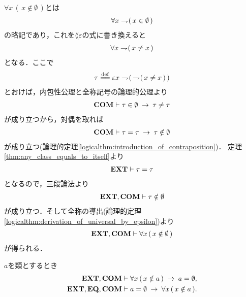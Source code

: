 	\begin{sketch}
		$\forall x\, (\, x \notin \emptyset\, )$とは
		\begin{align}
			\forall x \rightharpoondown\hspace{-0.25em} (\, x \in \emptyset\, )
		\end{align}
		の略記であり，これを$\lang{\varepsilon}$の式に書き換えると
		\begin{align}
			\forall x \rightharpoondown\hspace{-0.25em} (\, x \neq x\, )
		\end{align}
		となる．ここで
		\begin{align}
			\tau \defeq \varepsilon x \negation (\, \negation (\, x \neq x\, )\, )
		\end{align}
		とおけば，内包性公理と全称記号の論理的公理より
		\begin{align}
			\mbox{\bf COM} \vdash \tau \in \emptyset \hspace{0.25em}\rightarrow\hspace{0.25em} \tau \neq \tau
		\end{align}
		が成り立つから，対偶を取れば
		\begin{align}
			\mbox{\bf COM} \vdash \tau = \tau \hspace{0.25em}\rightarrow\hspace{0.25em} \tau \notin \emptyset
		\end{align}
		が成り立つ(論理的定理\ref{logicalthm:introduction_of_contraposition})．
		定理\ref{thm:any_class_equals_to_itself}より
		\begin{align}
			\mbox{{\bf EXT}} \vdash \tau = \tau
		\end{align}
		となるので，三段論法より
		\begin{align}
			\mbox{{\bf EXT}},\mbox{\bf COM} \vdash \tau \notin \emptyset
		\end{align}
		が成り立つ．そして全称の導出(論理的定理\ref{logicalthm:derivation_of_universal_by_epsilon})より
		\begin{align}
			\mbox{{\bf EXT}},\mbox{\bf COM} \vdash \forall x\, (\, x \notin \emptyset\, )
		\end{align}
		が得られる．
		\QED
	\end{sketch}
	
	\begin{screen}
		\begin{thm}[空の類は空集合に等しい]\label{thm:uniqueness_of_emptyset}
			$a$を類とするとき
			\begin{align}
				\mbox{{\bf EXT}},\mbox{\bf COM} &\vdash \forall x\, (\, x \notin a\, ) \hspace{0.25em}\rightarrow\hspace{0.25em} a = \emptyset, \\
				\mbox{{\bf EXT}},\mbox{{\bf EQ}},\mbox{\bf COM} &\vdash a = \emptyset \hspace{0.25em}\rightarrow\hspace{0.25em} \forall x\, (\, x \notin a\, ).
			\end{align}
		\end{thm}
	\end{screen}
	
